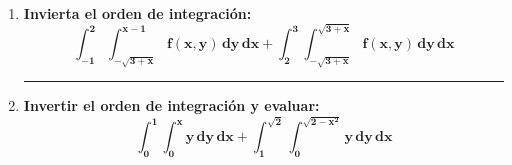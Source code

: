 \documentclass[12pt]{article}
\begin{document}
\begin{itemize}
\begin{enumerate}
                \hrule
                \item \textbf{Invierta el orden de integración:} \[\bm{\int_{-1}^{2} \int_{-\sqrt{3 + x}}^{x - 1} f(x, y) \, dy \, dx + \int_{2}^{3} \int_{-\sqrt{3 + x}}^{\sqrt{3 + x}} f(x, y) \, dy \, dx}\]
                

                \hrule
                \item \textbf{Invertir el orden de integración y evaluar:} \[\bm{\int_{0}^{1} \int_{0}^{x} y \, dy \, dx + \int_{1}^{\sqrt{2}} \int_{0}^{\sqrt{2 - x^2}} y \, dy \, dx}\]
                

            \end{enumerate}


    \end{itemize}
\end{document}
